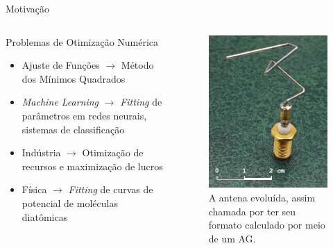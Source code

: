 \begin{frame}{Motivação}
  \begin{columns}
    \begin{column}{0.7\textwidth}
      \begin{block}{Problemas de Otimização Numérica}
        \vfill
        \begin{itemize}
          \item Ajuste de Funções $\rightarrow$ Método dos Mínimos Quadrados
          \item \textit{Machine Learning} $\rightarrow$ \textit{Fitting} de parâmetros em
                redes neurais, sistemas de classificação
          \item Indústria $\rightarrow$ Otimização de recursos e maximização de lucros
          \item Física $\rightarrow$ \textit{Fitting} de curvas de potencial de moléculas
                diatômicas \cite{roncaratti2006ga}
        \end{itemize}
      \end{block}
    \end{column}
    \begin{column}{0.3\textwidth}
      \begin{figure}
        \centering
        \includegraphics[width=\textwidth]{imagens/evolved_antenna.jpg}
        \caption{A antena evoluída, assim chamada por ter seu formato calculado por meio de um AG.}
      \end{figure}
    \end{column}
  \end{columns}
\end{frame}

